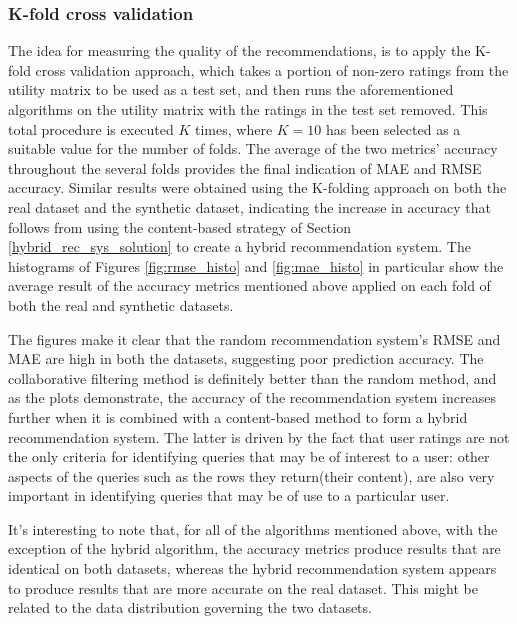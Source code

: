 \subsubsection{K-fold cross validation}
The idea for measuring the quality of the recommendations, is to apply the K-fold cross validation approach, which takes a portion of non-zero ratings from the utility matrix to be used as a test set, and then runs the aforementioned algorithms on the utility matrix with the ratings in the test set removed. This total procedure is executed $K$ times, where $K=10$ has been selected as a suitable value for the number of folds. The average of the two metrics' accuracy throughout the several folds provides the final indication of MAE and RMSE accuracy. Similar results were obtained using the K-folding approach on both the real dataset and the synthetic dataset, indicating the increase in accuracy that follows from using the content-based strategy of Section \ref{hybrid_rec_sys_solution} to create a hybrid recommendation system. The histograms of Figures \ref{fig:rmse_histo} and \ref{fig:mae_histo} in particular show the average result of the accuracy metrics mentioned above applied on each fold of both the real and synthetic datasets. 

The figures make it clear that the random recommendation system's RMSE and MAE are high in both the datasets, suggesting poor prediction accuracy. The collaborative filtering method is definitely better than the random method, and as the plots demonstrate, the accuracy of the recommendation system increases further when it is combined with a content-based method to form a hybrid recommendation system. The latter is driven by the fact that user ratings are not the only criteria for identifying queries that may be of interest to a user: other aspects of the queries such as the rows they return(their content), are also very important in identifying queries that may be of use to a particular user. 




It's interesting to note that, for all of the algorithms mentioned above, with the exception of the hybrid algorithm, the accuracy metrics produce results that are identical on both datasets, whereas the hybrid recommendation system appears to produce results that are more accurate on the real dataset. This might be related to the data distribution governing the two datasets.


